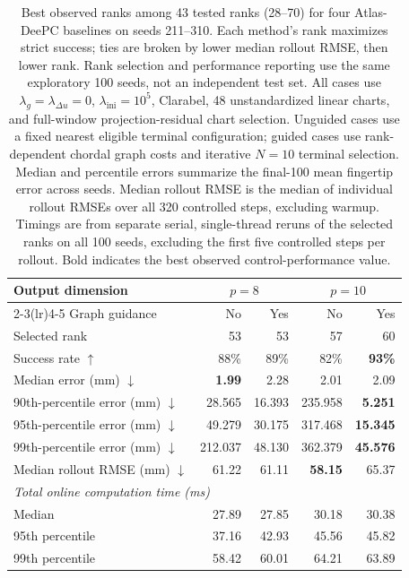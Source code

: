\documentclass[10pt]{article}
\begin{document}
\begin{table}[htbp]
    \centering
    \small
    \begin{tabular}{lrrrr}
        \toprule
        Output dimension & \multicolumn{2}{c}{$p=8$} & \multicolumn{2}{c}{$p=10$} \\
        \cmidrule(lr){2-3}\cmidrule(lr){4-5}
        Graph guidance & No & Yes & No & Yes \\
        \midrule
        Selected rank & 53 & 53 & 57 & 60 \\
        Success rate $\uparrow$ & 88\% & 89\% & 82\% & \textbf{93\%} \\
        Median error (mm) $\downarrow$ & \textbf{1.99} & 2.28 & 2.01 & 2.09 \\
        90th-percentile error (mm) $\downarrow$ & 28.565 & 16.393 & 235.958 & \textbf{5.251} \\
        95th-percentile error (mm) $\downarrow$ & 49.279 & 30.175 & 317.468 & \textbf{15.345} \\
        99th-percentile error (mm) $\downarrow$ & 212.037 & 48.130 & 362.379 & \textbf{45.576} \\
        Median rollout RMSE (mm) $\downarrow$ & 61.22 & 61.11 & \textbf{58.15} & 65.37 \\
        \midrule
        \multicolumn{5}{l}{\textit{Total online computation time (ms)}} \\
        Median & 27.89 & 27.85 & 30.18 & 30.38 \\
        95th percentile & 37.16 & 42.93 & 45.56 & 45.82 \\
        99th percentile & 58.42 & 60.01 & 64.21 & 63.89 \\
        \bottomrule
    \end{tabular}
    \caption{Best observed ranks among 43 tested ranks (28--70) for four Atlas-DeePC baselines on seeds 211--310. Each method's rank maximizes strict success; ties are broken by lower median rollout RMSE, then lower rank. Rank selection and performance reporting use the same exploratory 100 seeds, not an independent test set. All cases use $\lambda_g=\lambda_{\Delta u}=0$, $\lambda_{\mathrm{ini}}=10^5$, Clarabel, 48 unstandardized linear charts, and full-window projection-residual chart selection. Unguided cases use a fixed nearest eligible terminal configuration; guided cases use rank-dependent chordal graph costs and iterative $N=10$ terminal selection. Median and percentile errors summarize the final-100 mean fingertip error across seeds. Median rollout RMSE is the median of individual rollout RMSEs over all 320 controlled steps, excluding warmup. Timings are from separate serial, single-thread reruns of the selected ranks on all 100 seeds, excluding the first five controlled steps per rollout. Bold indicates the best observed control-performance value.}
    \label{tab:four-baselines-selected-ranks}
\end{table}
\end{document}
